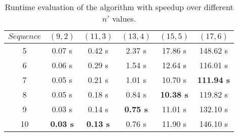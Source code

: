 \begin{table}[h] %
	\renewcommand{\arraystretch}{1.3}
	\label{tbl:nprime-speedup}
	\centering
	\begin{tabular}{|c|c|c|c|c|c|}
		\hline 
		\bfseries\boldmath $Sequence$ & 
		\bfseries\boldmath $(9,2)$ & 
		\bfseries\boldmath $(11,3)$ & 
		\bfseries\boldmath $(13,4)$ & 
		\bfseries\boldmath $(15,5)$ & 
		\bfseries\boldmath $(17,6)$ \\
		\hline
			5	& 	0.07 s			& 	0.42 s 			&	2.37 s			&	17.86 s				&	148.62 s\\
			6	& 	0.06 s			& 	0.29 s			& 	1.54 s			&	12.64 s				&	116.01 s\\
			7	& 	0.05 s			& 	0.21 s			& 	1.01 s			&	10.70 s				&	\textbf{111.94 s}\\
			8	& 	0.05 s			&	0.18 s			& 	0.84 s			&	\textbf{10.38 s}	&	119.82 s\\
			9	& 	0.03 s 			& 	0.14 s			& 	\textbf{0.75 s}	&	11.01 s				&	132.10 s\\
			10	& 	\textbf{0.03 s} &	\textbf{0.13 s}	& 	0.76 s			&	11.90 s				&	146.10 s\\
		\hline\end{tabular}
	\caption{Runtime evaluation of the algorithm with speedup over different $n'$ values.}
\end{table}